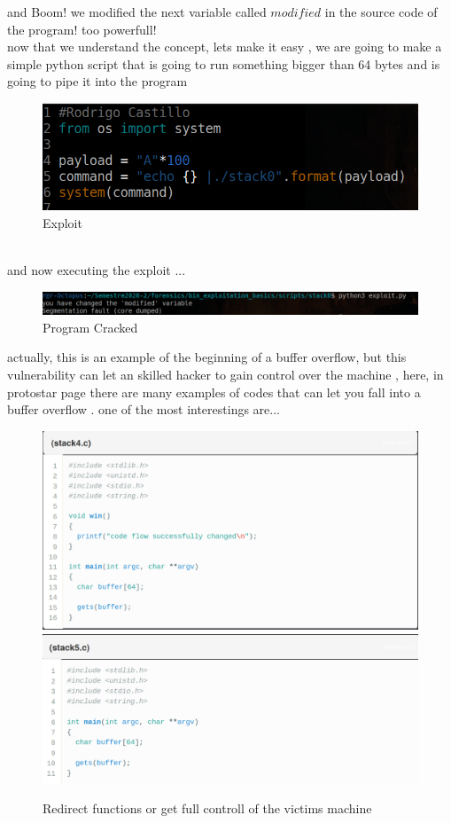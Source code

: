 \documentclass[10pt,a4paper]{article} %
\begin{document}
            and Boom! we modified the next variable called $ modified  $ in the
            source code of the program! too powerfull!
            \\ now that we understand the concept, lets make it easy , we are
            going to make a simple python script that is going to run something
            bigger than 64 bytes and is going to pipe it into the program
            \begin{figure}[h!]
                \centering
                \includegraphics[width=0.5\linewidth]{exploitpy.png}
                \caption{Exploit}
                \label{fig:exploitpy}
            \end{figure}

            \\ and now executing the exploit ...
            \begin{figure}[h!]
                \centering
                \includegraphics[width=0.5\linewidth]{booom.png}
                \caption{Program Cracked}
                \label{fig:boom}
            \end{figure}
            actually, this is an example of the beginning of a buffer overflow,
            but this vulnerability can let an skilled hacker to gain control
            over the machine , here, in protostar page there are many examples
            of codes that can let you fall into a buffer overflow . one of the most interestings are...
            \begin{figure}[h!]
                \centering
                \includegraphics[width=0.5\linewidth]{redirectfunctions.png}
                \includegraphics[width=0.5\linewidth]{solo.png}
                \caption{Redirect functions or get full controll of the victims machine}
                \label{fig:redirectfunctions}
            \end{figure}
\end{document}

